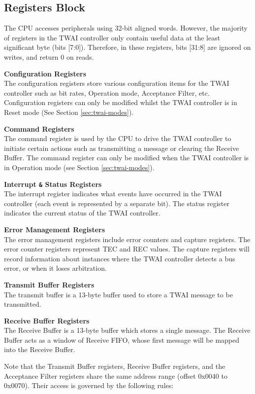 \documentclass[main\_\_EN.tex]{subfiles}
\begin{document}
\subsection{Registers Block}
The \chipname{} CPU accesses peripherals using 32-bit aligned words. However, the majority of registers in the TWAI controller only contain useful data at the least significant byte (bits [7:0]). Therefore, in these registers, bits [31:8] are ignored on writes, and return 0 on reads.

{\bfseries Configuration Registers}\\
The configuration registers store various configuration items for the TWAI controller such as bit rates, Operation mode, Acceptance Filter, etc. Configuration registers can only be modified whilst the TWAI controller is in Reset mode (See Section \ref{sec:twai-modes}).

{\bfseries Command Registers}\\
The command register is used by the CPU to drive the TWAI controller to initiate certain actions such as transmitting a message or clearing the Receive Buffer. The command register can only be modified when the TWAI controller is in Operation mode (see Section \ref{sec:twai-modes}).

{\bfseries Interrupt \verb+&+ Status Registers}\\
The interrupt register indicates what events have occurred in the TWAI controller (each event is represented by a separate bit). The status register indicates the current status of the TWAI controller.

{\bfseries Error Management Registers}\\
The error management registers include error counters and capture registers. The error counter registers represent TEC and REC values. The capture registers will record information about instances where the TWAI controller detects a bus error, or when it loses arbitration.

{\bfseries Transmit Buffer Registers}\\
The transmit buffer is a 13-byte buffer used to store a TWAI message to be transmitted.

{\bfseries Receive Buffer Registers}\\
The Receive Buffer is a 13-byte buffer which stores a single message. The Receive Buffer acts as a window of Receive FIFO, whose first message will be mapped into the Receive Buffer.

Note that the Transmit Buffer registers, Receive Buffer registers, and the Acceptance Filter registers share the same address range (offset 0x0040 to 0x0070). Their access is governed by the following rules:
\end{document}
